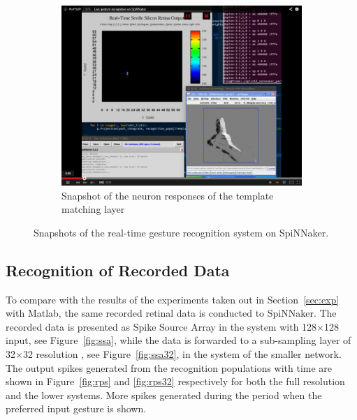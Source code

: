 \documentclass[journal]{journal}
\begin{document}
\begin{figure}
\begin{subfigure}[t]{0.42\textwidth}
		\includegraphics[width=\textwidth]{pics/live.png}
		\caption{Snapshot of the neuron responses of the template matching layer}
	    \label{fig:live3}
	\end{subfigure}	

\caption{Snapshots of the real-time gesture recognition system on SpiNNaker.
}
\label{fig:live}
\end{figure}

\subsection{Recognition of Recorded Data}
To compare with the results of the experiments taken out in Section~\ref{sec:exp} with Matlab, the same recorded retinal data is conducted to SpiNNaker. 
The recorded data is presented as Spike Source Array in the system with 128$\times$128 input, see Figure~\ref{fig:ssa}, while the data is forwarded to a sub-sampling layer of 32$\times$32 resolution 
, see Figure~\ref{fig:ssa32}, in the system of the smaller network. 
The output spikes generated from the recognition populations with time are shown in Figure~\ref{fig:rps} and \ref{fig:rps32} respectively for both the full resolution and the lower systems. 
More spikes generated during the period when the preferred input gesture is shown. 
\end{document}
